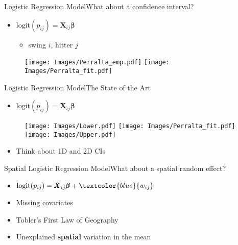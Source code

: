 \documentclass{beamer}
\begin{document}
\begin{frame}{Logistic Regression Model}{What about a confidence interval?} %
\begin{itemize}

\item $ \text{logit}(p_{ij}) = \pmb{X}_{ij} \pmb{\beta}$
  \begin{itemize}
  \item swing $i$, hitter $j$
  \end{itemize}
\end{itemize}
  \begin{figure}[H]
	\centering
	\texttt{[image: Images/Perralta\_emp.pdf]}
	\texttt{[image: Images/Perralta\_fit.pdf]}
	\end{figure}
\end{frame}

\begin{frame}{Logistic Regression Model}{The State of the Art} %
\begin{itemize}

\item $ \text{logit}(p_{ij}) = \pmb{X}_{ij} \pmb{\beta}$
\end{itemize}
  \begin{figure}[H]
	\centering
	\texttt{[image: Images/Lower.pdf]}
	\texttt{[image: Images/Perralta\_fit.pdf]}
	\texttt{[image: Images/Upper.pdf]}
	\end{figure}
\begin{itemize}
\item Think about 1D and 2D CIs
\end{itemize}
\end{frame}

\begin{frame}{Spatial Logistic Regression Model}{What about a spatial random effect?} %
\begin{itemize}
\addtolength{\itemsep}{0.5\baselineskip}
\item $ \text{logit}(p_{ij}) = \pmb{X}_{ij} \pmb{\beta} + \textcolor{blue}{w_{ij}}$
\item Missing covariates
\item Tobler's First Law of Geography
\item Unexplained {\bf spatial} variation in the mean
\end{itemize}
\end{frame}
\end{document}
